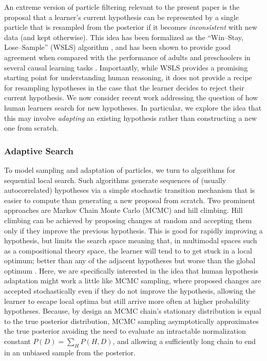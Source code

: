 \documentclass[doc,natbib,floatsintext]{apa7}
\begin{document}
An extreme version of particle filtering relevant to the present paper is the proposal that a learner's current hypothesis can be represented by a single particle that is resampled from the posterior if it becomes \textit{inconsistent} with new data (and kept otherwise). This idea has been formalized as the ``Win--Stay, Lose--Sample'' (WSLS) algorithm \citep{bonawitz2014win}, and has been shown to provide good agreement when compared with the performance of adults and preschoolers in several causal learning tasks \citep{bonawitz2014win,bonawitz2014probabilistic}. Importantly, while WSLS provides a promising starting point for understanding human reasoning, it does not provide a recipe for resampling hypotheses in the case that the learner decides to reject their current hypothesis. We now consider recent work addressing the question of how human learners search for new hypotheses. In particular, we explore the idea that this may involve \textit{adapting} an existing hypothesis rather than constructing a new one from scratch.

\subsubsection{Adaptive Search}
To model sampling and adaptation of particles, we turn to algorithms for sequential local search. Such algorithms generate sequences of (usually autocorrelated) hypotheses via a simple stochastic transition mechanism that is easier to compute than generating a new proposal from scratch. Two prominent approaches are Markov Chain Monte Carlo (MCMC) and hill climbing. Hill climbing can be achieved by proposing changes at random and accepting them only if they improve the previous hypothesis. This is good for rapidly improving a hypothesis, but limits the search space meaning that, in multimodal spaces such as a compositional theory space, the learner will tend to to get stuck in a local optimum; better than any of the adjacent hypotheses but worse than the global optimum \citep{ullman2012theory}. Here, we are specifically interested in the idea that human hypothesis adaptation might work a little like MCMC sampling, where proposed changes are accepted stochastically even if they do not improve the hypothesis, allowing the learner to escape local optima but still arrive more often at higher probability hypotheses. Because, by design an MCMC chain's stationary distribution is equal to the true posterior distribution, MCMC sampling asymptotically approximates the true posterior avoiding the need to evaluate an intractable normalization constant \(P(D) = \sum_{H}P(H,D)\), and allowing a sufficiently long chain to end in an unbiased sample from the posterior. 
\end{document}

